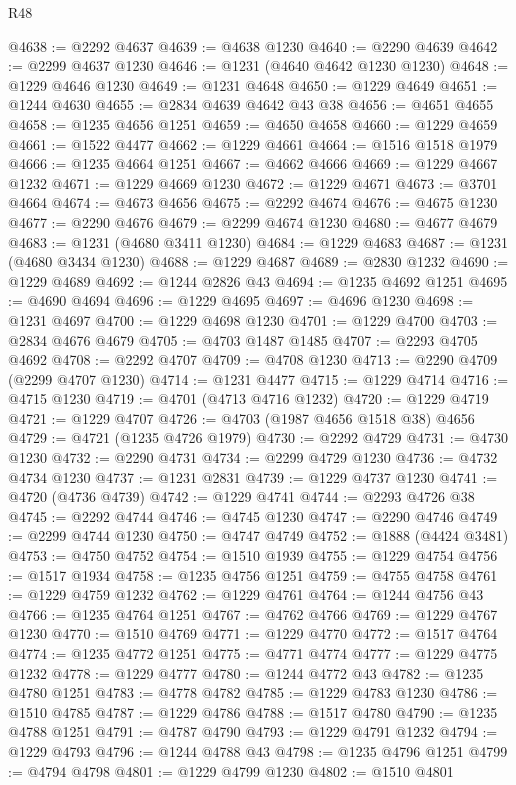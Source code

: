\begin{lexlean}{R48}
\begin{coremodule}
@4638 := @2292 @4637
@4639 := @4638 @1230
@4640 := @2290 @4639
@4642 := @2299 @4637 @1230
@4646 := @1231 (@4640 @4642 @1230 @1230)
@4648 := @1229 @4646 @1230
@4649 := @1231 @4648
@4650 := @1229 @4649
@4651 := @1244 @4630
@4655 := @2834 @4639 @4642 @43 @38
@4656 := @4651 @4655
@4658 := @1235 @4656 @1251
@4659 := @4650 @4658
@4660 := @1229 @4659
@4661 := @1522 @4477
@4662 := @1229 @4661
@4664 := @1516 @1518 @1979
@4666 := @1235 @4664 @1251
@4667 := @4662 @4666
@4669 := @1229 @4667 @1232
@4671 := @1229 @4669 @1230
@4672 := @1229 @4671
@4673 := @3701 @4664
@4674 := @4673 @4656
@4675 := @2292 @4674
@4676 := @4675 @1230
@4677 := @2290 @4676
@4679 := @2299 @4674 @1230
@4680 := @4677 @4679
@4683 := @1231 (@4680 @3411 @1230)
@4684 := @1229 @4683
@4687 := @1231 (@4680 @3434 @1230)
@4688 := @1229 @4687
@4689 := @2830 @1232
@4690 := @1229 @4689
@4692 := @1244 @2826 @43
@4694 := @1235 @4692 @1251
@4695 := @4690 @4694
@4696 := @1229 @4695
@4697 := @4696 @1230
@4698 := @1231 @4697
@4700 := @1229 @4698 @1230
@4701 := @1229 @4700
@4703 := @2834 @4676 @4679
@4705 := @4703 @1487 @1485
@4707 := @2293 @4705 @4692
@4708 := @2292 @4707
@4709 := @4708 @1230
@4713 := @2290 @4709 (@2299 @4707 @1230)
@4714 := @1231 @4477
@4715 := @1229 @4714
@4716 := @4715 @1230
@4719 := @4701 (@4713 @4716 @1232)
@4720 := @1229 @4719
@4721 := @1229 @4707
@4726 := @4703 (@1987 @4656 @1518 @38) @4656
@4729 := @4721 (@1235 @4726 @1979)
@4730 := @2292 @4729
@4731 := @4730 @1230
@4732 := @2290 @4731
@4734 := @2299 @4729 @1230
@4736 := @4732 @4734 @1230
@4737 := @1231 @2831
@4739 := @1229 @4737 @1230
@4741 := @4720 (@4736 @4739)
@4742 := @1229 @4741
@4744 := @2293 @4726 @38
@4745 := @2292 @4744
@4746 := @4745 @1230
@4747 := @2290 @4746
@4749 := @2299 @4744 @1230
@4750 := @4747 @4749
@4752 := @1888 (@4424 @3481)
@4753 := @4750 @4752
@4754 := @1510 @1939
@4755 := @1229 @4754
@4756 := @1517 @1934
@4758 := @1235 @4756 @1251
@4759 := @4755 @4758
@4761 := @1229 @4759 @1232
@4762 := @1229 @4761
@4764 := @1244 @4756 @43
@4766 := @1235 @4764 @1251
@4767 := @4762 @4766
@4769 := @1229 @4767 @1230
@4770 := @1510 @4769
@4771 := @1229 @4770
@4772 := @1517 @4764
@4774 := @1235 @4772 @1251
@4775 := @4771 @4774
@4777 := @1229 @4775 @1232
@4778 := @1229 @4777
@4780 := @1244 @4772 @43
@4782 := @1235 @4780 @1251
@4783 := @4778 @4782
@4785 := @1229 @4783 @1230
@4786 := @1510 @4785
@4787 := @1229 @4786
@4788 := @1517 @4780
@4790 := @1235 @4788 @1251
@4791 := @4787 @4790
@4793 := @1229 @4791 @1232
@4794 := @1229 @4793
@4796 := @1244 @4788 @43
@4798 := @1235 @4796 @1251
@4799 := @4794 @4798
@4801 := @1229 @4799 @1230
@4802 := @1510 @4801

\end{coremodule}
\end{lexlean}
